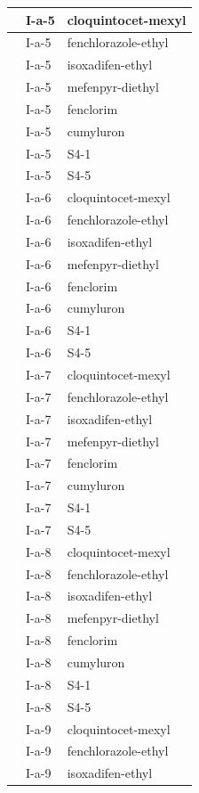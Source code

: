 \documentclass[11pt,a4paper]{article}
\begin{document}
\begin{table}[h]
\begin{tabular}{|l|l|l|}
 & I-a-5 & cloquintocet-mexyl \\ \hline
 & I-a-5 & fenchlorazole-ethyl \\ \hline
 & I-a-5 & isoxadifen-ethyl \\ \hline
 & I-a-5 & mefenpyr-diethyl \\ \hline
 & I-a-5 & fenclorim \\ \hline
 & I-a-5 & cumyluron \\ \hline
 & I-a-5 & S4-1 \\ \hline
 & I-a-5 & S4-5 \\ \hline
 & I-a-6 & cloquintocet-mexyl \\ \hline
 & I-a-6 & fenchlorazole-ethyl \\ \hline
 & I-a-6 & isoxadifen-ethyl \\ \hline
 & I-a-6 & mefenpyr-diethyl \\ \hline
 & I-a-6 & fenclorim \\ \hline
 & I-a-6 & cumyluron \\ \hline
 & I-a-6 & S4-1 \\ \hline
 & I-a-6 & S4-5 \\ \hline
 & I-a-7 & cloquintocet-mexyl \\ \hline
 & I-a-7 & fenchlorazole-ethyl \\ \hline
 & I-a-7 & isoxadifen-ethyl \\ \hline
 & I-a-7 & mefenpyr-diethyl \\ \hline
 & I-a-7 & fenclorim \\ \hline
 & I-a-7 & cumyluron \\ \hline
 & I-a-7 & S4-1 \\ \hline
 & I-a-7 & S4-5 \\ \hline
 & I-a-8 & cloquintocet-mexyl \\ \hline
 & I-a-8 & fenchlorazole-ethyl \\ \hline
 & I-a-8 & isoxadifen-ethyl \\ \hline
 & I-a-8 & mefenpyr-diethyl \\ \hline
 & I-a-8 & fenclorim \\ \hline
 & I-a-8 & cumyluron \\ \hline
 & I-a-8 & S4-1 \\ \hline
 & I-a-8 & S4-5 \\ \hline
 & I-a-9 & cloquintocet-mexyl \\ \hline
 & I-a-9 & fenchlorazole-ethyl \\ \hline
 & I-a-9 & isoxadifen-ethyl \\ \hline

\end{tabular}
\end{table}
\end{document}

